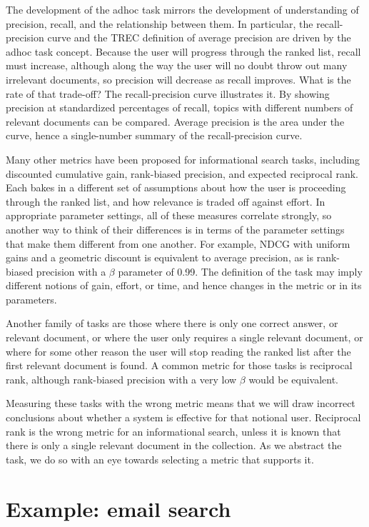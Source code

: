 \documentclass[nobib]{tufte-book}
\begin{document}
The development of the adhoc task mirrors the development of understanding of precision, recall, and the relationship between them.  In particular, the recall-precision curve and the TREC definition of average precision are driven by the adhoc task concept.  Because the user will progress through the ranked list, recall must increase, although along the way the user will no doubt throw out many irrelevant documents, so precision will decrease as recall improves.  What is the rate of that trade-off?  The recall-precision curve illustrates it.  By showing precision at standardized percentages of recall, topics with different numbers of relevant documents can be compared.  Average precision is the area under the curve, hence a single-number summary of the recall-precision curve.

Many other metrics have been proposed for informational search tasks, including discounted cumulative gain, rank-biased precision, and expected reciprocal rank.  Each bakes in a different set of assumptions about how the user is proceeding through the ranked list, and how relevance is traded off against effort.  In appropriate parameter settings, all of these measures correlate strongly, so another way to think of their differences is in terms of the parameter settings that make them different from one another.  For example, NDCG with uniform gains and a geometric discount is equivalent to average precision, as is rank-biased precision with a $\beta$ parameter of 0.99.  The definition of the task may imply different notions of gain, effort, or time, and hence changes in the metric or in its parameters.

Another family of tasks are those where there is only one correct answer, or relevant document, or where the user only requires a single relevant document, or where for some other reason the user will stop reading the ranked list after the first relevant document is found.  A common metric for those tasks is reciprocal rank, although rank-biased precision with a very low $\beta$ would be equivalent.

Measuring these tasks with the wrong metric means that we will draw incorrect conclusions about whether a system is effective for that notional user.  Reciprocal rank is the wrong metric for an informational search, unless it is known that there is only a single relevant document in the collection.  As we abstract the task, we do so with an eye towards selecting a metric that supports it.

\section{Example: email search}
\end{document}
